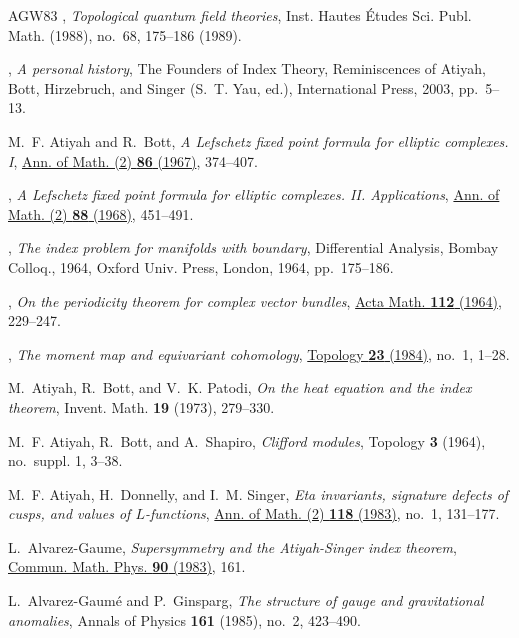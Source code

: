 \documentclass[11pt]{amsart}
\theoremstyle{definition}
\theoremstyle{remark}
\theoremstyle{plain}
\numberwithin{equation}{section}
\renewcommand{\:}{\colon}
\begin{document}
\begin{thebibliography}{AGW83}
\bysame, \emph{Topological quantum field theories}, Inst. Hautes \'Etudes Sci.
  Publ. Math. (1988), no.~68, 175--186 (1989).

\bysame, \emph{A personal history}, The Founders of Index Theory, Reminiscences
  of Atiyah, Bott, Hirzebruch, and Singer (S.~T. Yau, ed.), International
  Press, 2003, pp.~5--13.

M.~F. Atiyah and R.~Bott, \emph{A {L}efschetz fixed point formula for elliptic
  complexes. {I}}, \href{http://dx.doi.org/10.2307/1970694}{Ann. of Math. (2)
  \textbf{86} (1967)}, 374--407.

\bysame, \emph{A {L}efschetz fixed point formula for elliptic complexes. {II}.
  {A}pplications}, \href{http://dx.doi.org/10.2307/1970721}{Ann. of Math. (2)
  \textbf{88} (1968)}, 451--491.

\bysame, \emph{The index problem for manifolds with boundary}, Differential
  {A}nalysis, {B}ombay {C}olloq., 1964, Oxford Univ. Press, London, 1964,
  pp.~175--186.

\bysame, \emph{On the periodicity theorem for complex vector bundles},
  \href{http://dx.doi.org/10.1007/BF02391772}{Acta Math. \textbf{112} (1964)},
  229--247.

\bysame, \emph{The moment map and equivariant cohomology},
  \href{http://dx.doi.org/10.1016/0040-9383(84)90021-1}{Topology \textbf{23}
  (1984)}, no.~1, 1--28.

M.~Atiyah, R.~Bott, and V.~K. Patodi, \emph{On the heat equation and the index
  theorem}, Invent. Math. \textbf{19} (1973), 279--330.

M.~F. Atiyah, R.~Bott, and A.~Shapiro, \emph{Clifford modules}, Topology
  \textbf{3} (1964), no.~suppl. 1, 3--38.

M.~F. Atiyah, H.~Donnelly, and I.~M. Singer, \emph{Eta invariants, signature
  defects of cusps, and values of {$L$}-functions},
  \href{http://dx.doi.org/10.2307/2006957}{Ann. of Math. (2) \textbf{118}
  (1983)}, no.~1, 131--177.

L.~Alvarez-Gaume, \emph{Supersymmetry and the {A}tiyah-{S}inger index theorem},
  \href{http://dx.doi.org/10.1007/BF01205500}{Commun. Math. Phys. \textbf{90}
  (1983)},
161.

L.~Alvarez-Gaum{\'e} and P.~Ginsparg, \emph{The structure of gauge and
  gravitational anomalies}, Annals of Physics \textbf{161} (1985), no.~2,
  423--490.


\end{thebibliography}
\end{document}
